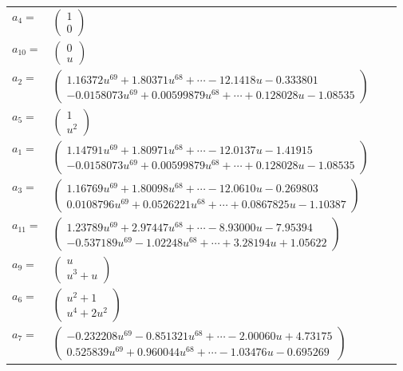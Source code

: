 \documentclass[1p]{elsarticle_modified}
\theoremstyle{definition}
\begin{document}
\begin{tabular}{m{7pt} m{180pt} m{7pt} m{180pt} }
\flushright $a_{4}=$&$\begin{pmatrix}1\\0\end{pmatrix}$ \\
\flushright $a_{10}=$&$\begin{pmatrix}0\\u\end{pmatrix}$ \\
\flushright $a_{2}=$&$\begin{pmatrix}1.16372 u^{69}+1.80371 u^{68}+\cdots-12.1418 u-0.333801\\-0.0158073 u^{69}+0.00599879 u^{68}+\cdots+0.128028 u-1.08535\end{pmatrix}$ \\
\flushright $a_{5}=$&$\begin{pmatrix}1\\u^2\end{pmatrix}$ \\
\flushright $a_{1}=$&$\begin{pmatrix}1.14791 u^{69}+1.80971 u^{68}+\cdots-12.0137 u-1.41915\\-0.0158073 u^{69}+0.00599879 u^{68}+\cdots+0.128028 u-1.08535\end{pmatrix}$ \\
\flushright $a_{3}=$&$\begin{pmatrix}1.16769 u^{69}+1.80098 u^{68}+\cdots-12.0610 u-0.269803\\0.0108796 u^{69}+0.0526221 u^{68}+\cdots+0.0867825 u-1.10387\end{pmatrix}$ \\
\flushright $a_{11}=$&$\begin{pmatrix}1.23789 u^{69}+2.97447 u^{68}+\cdots-8.93000 u-7.95394\\-0.537189 u^{69}-1.02248 u^{68}+\cdots+3.28194 u+1.05622\end{pmatrix}$ \\
\flushright $a_{9}=$&$\begin{pmatrix}u\\u^3+u\end{pmatrix}$ \\
\flushright $a_{6}=$&$\begin{pmatrix}u^2+1\\u^4+2 u^2\end{pmatrix}$ \\
\flushright $a_{7}=$&$\begin{pmatrix}-0.232208 u^{69}-0.851321 u^{68}+\cdots-2.00060 u+4.73175\\0.525839 u^{69}+0.960044 u^{68}+\cdots-1.03476 u-0.695269\end{pmatrix}$ \\

\end{tabular}
\end{document}
